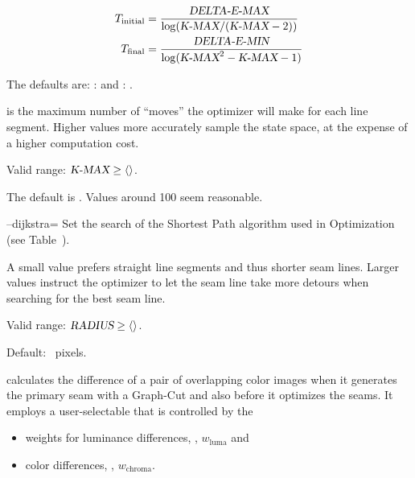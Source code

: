 \begin{codelist}
\begin{codelist}
    \begin{align*}
      T_{\mathrm{initial}} &= \frac{\textsl{DELTA-E-MAX}}{\log(\textsl{K-MAX} / (\textsl{K-MAX} - 2))} \\
      T_{\mathrm{final}} &= \frac{\textsl{DELTA-E-MIN}}{\log(\textsl{K-MAX}^2 - \textsl{K-MAX} - 1)}
    \end{align*}

    The defaults are: :
     and :
    .

  \item[\metavar{K-MAX}]\itemend {} is the maximum number
    of ``moves'' the optimizer will make for each line segment.
    Higher values more accurately sample the state space, at the
    expense of a higher computation cost.

    Valid range: $\metavar{K-MAX} \geq \val{val:minimum-anneal-kmax}$.

    The default is .  Values around 100
    seem reasonable.
  \end{codelist}


  \label{opt:dijkstra}%
\item[--dijkstra=\metavar{RADIUS}]\itemend Set the search
   of the  Shortest Path
  algorithm used in  Optimization (see
  Table~).

  A small value prefers straight line segments and thus shorter seam
  lines.  Larger values instruct the optimizer to let the seam line
  take more detours when searching for the best seam line.

  Valid range: $\metavar{RADIUS} \geq \val{val:minimum-dijkstra-radius}$.

  Default: ~pixels.


  \label{opt:image-difference}%
\item[\itempar{--image-difference=\metavar{ALGORITHM}\optional{:\feasiblebreak
      \metavar{LUMINANCE-WEIGHT}\optional{:
        \feasiblebreak\metavar{CHROMINANCE-WEIGHT}}}}]\itemend
  \App{} calculates the difference
   of a pair of overlapping color images when
  it generates the primary seam with a Graph-Cut and also before it
  optimizes the seams.  It employs a user-selectable
   that is controlled by the
  \begin{itemize}
  \item
    weights for luminance differences, ,
    $w_{\mathrm{luma}}$ and
  \item
    color differences, ,
    $w_{\mathrm{chroma}}$.
  \end{itemize}


\end{codelist}
